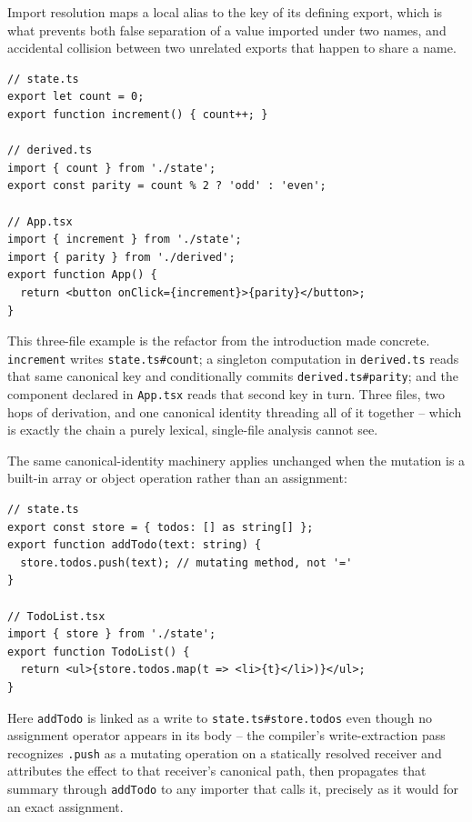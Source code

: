 \documentclass[conference]{IEEEtran}
\begin{document}
Import resolution maps a local alias to the key of its defining export, which
is what prevents both false separation of a value imported under two names,
and accidental collision between two unrelated exports that happen to share a
name.

\begin{lstlisting}[caption={Cross-module state, derivation, and view}]
// state.ts
export let count = 0;
export function increment() { count++; }

// derived.ts
import { count } from './state';
export const parity = count % 2 ? 'odd' : 'even';

// App.tsx
import { increment } from './state';
import { parity } from './derived';
export function App() {
  return <button onClick={increment}>{parity}</button>;
}
\end{lstlisting}

This three-file example is the refactor from the introduction made concrete.
\texttt{increment} writes \texttt{state.ts\#count}; a singleton computation in
\texttt{derived.ts} reads that same canonical key and conditionally commits
\texttt{derived.ts\#parity}; and the component declared in \texttt{App.tsx}
reads that second key in turn. Three files, two hops of derivation, and one
canonical identity threading all of it together -- which is exactly the chain
a purely lexical, single-file analysis cannot see.

The same canonical-identity machinery applies unchanged when the mutation is
a built-in array or object operation rather than an assignment:

\begin{lstlisting}[caption={Mutating-method write via an imported helper}]
// state.ts
export const store = { todos: [] as string[] };
export function addTodo(text: string) {
  store.todos.push(text); // mutating method, not '='
}

// TodoList.tsx
import { store } from './state';
export function TodoList() {
  return <ul>{store.todos.map(t => <li>{t}</li>)}</ul>;
}
\end{lstlisting}

Here \texttt{addTodo} is linked as a write to
\texttt{state.ts\#store.todos} even though no assignment operator appears in
its body -- the compiler's write-extraction pass recognizes
\texttt{.push} as a mutating operation on a statically resolved receiver and
attributes the effect to that receiver's canonical path, then propagates that
summary through \texttt{addTodo} to any importer that calls it, precisely as
it would for an exact assignment.
\end{document}
